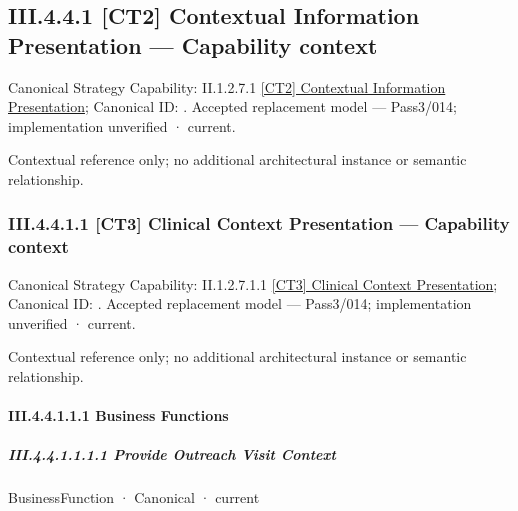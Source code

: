 \subsection*{III.4.4.1 [CT2] Contextual Information Presentation — Capability context}
\label{navigation:III.4.4.1}

{\small Canonical Strategy Capability: II.1.2.7.1 \hyperref[element:c24e23b5f3fd454aa861e66dc085267b]{[CT2] Contextual Information Presentation}; Canonical ID: \texttt{}. Accepted replacement model — Pass3/014; implementation unverified · current.}\par
Contextual reference only; no additional architectural instance or semantic relationship.\par
\subsubsection*{III.4.4.1.1 [CT3] Clinical Context Presentation — Capability context}
\label{navigation:III.4.4.1.1}

{\small Canonical Strategy Capability: II.1.2.7.1.1 \hyperref[element:b113ca12a3fd47aea3eb87cbee2dcec9]{[CT3] Clinical Context Presentation}; Canonical ID: \texttt{}. Accepted replacement model — Pass3/014; implementation unverified · current.}\par
Contextual reference only; no additional architectural instance or semantic relationship.\par
\paragraph*{III.4.4.1.1.1 Business Functions}
\label{navigation:III.4.4.1.1.1}

\subparagraph*{III.4.4.1.1.1.1 Provide Outreach Visit Context}
\label{navigation:III.4.4.1.1.1.1}

\label{element:4984d2f87f5a46869400c60cd5c5e0ab}
{\small BusinessFunction · Canonical · current}\par

